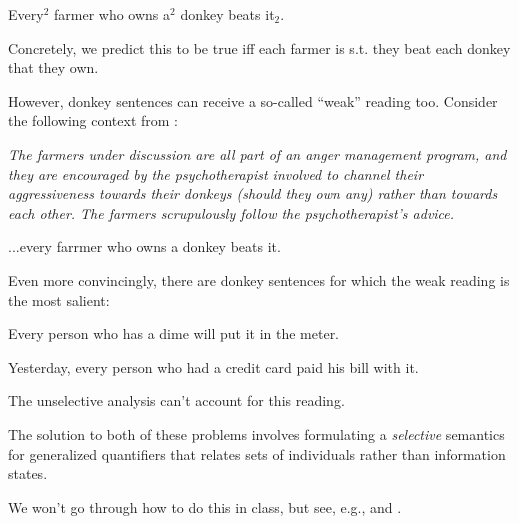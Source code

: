\documentclass[nols,twoside,nofonts,nobib,nohyper]{tufte-handout}
\theoremstyle{definition}
\begin{document}
\ex
Every$^{2}$ farmer who owns a$^{2}$ donkey beats it$_{2}$.
\xe

Concretely, we predict this to be true iff each farmer is s.t. they beat each donkey that they own.

However, donkey sentences can receive a so-called \enquote{weak} reading too. Consider the following context from \cite{Chierchia1995}:

\textit{The farmers under discussion are all part of an anger management program, and they are encouraged by the psychotherapist involved to channel their aggressiveness towards their donkeys (should they own any) rather than towards each other. The farmers scrupulously follow the psychotherapist's advice.}

\ex
...every farrmer who owns a donkey beats it.
\xe

Even more convincingly, there are donkey sentences for which the weak reading is the most salient:

\ex
Every person who has a dime will put it in the meter.
\xe

\ex
Yesterday, every person who had a credit card paid his bill with it.
\xe

The unselective analysis can't account for this reading.

The solution to both of these problems involves formulating a \textit{selective} semantics for generalized quantifiers that relates sets of individuals rather than information states.

We won't go through how to do this in class, but see, e.g., \cite{Chierchia1995} and \cite{Kanazawa1994}.

\printbibliography
\end{document}
